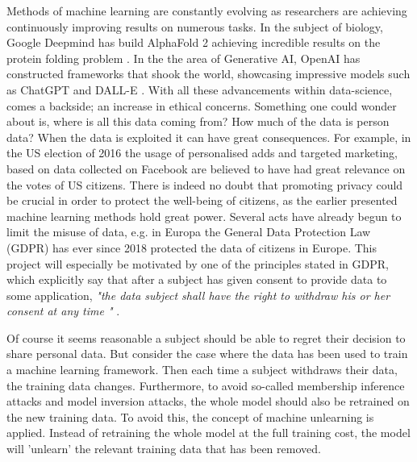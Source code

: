



Methods of machine learning are constantly evolving as researchers are achieving continuously improving results on numerous tasks. In the subject of biology, Google Deepmind has build AlphaFold 2 achieving incredible results on the protein folding problem \cite{jumper_highly_2021}. In the the area of Generative AI, OpenAI has constructed frameworks that shook the world, showcasing impressive models such as ChatGPT \cite{brown_language_2020} and DALL-E \cite{ramesh_zero-shot_2021}. With all these advancements within data-science, comes a backside; an increase in ethical concerns. Something one could wonder about is, where is all this data coming from? How much of the data is person data? When the data is exploited it can have great consequences. For example, in the US election of 2016 the usage of personalised adds and targeted marketing, based on data collected on Facebook are believed to have had great relevance on the votes of US citizens. There is indeed no doubt that promoting privacy could be crucial in order to protect the well-being of citizens, as the earlier presented machine learning methods hold great power.  Several acts have already begun to limit the misuse of data, e.g. in Europa the General Data Protection Law (GDPR) has ever since 2018 protected the data of citizens in Europe. This project will especially be motivated by one of the principles stated in GDPR, which explicitly say that after a subject has given consent to provide data to some application, \textit{"the data subject shall have the right to withdraw his or her consent at any time "}  \cite{noauthor_art_nodate}. 

\begin{comment}
\textit{The right to be forgotten} is something that has been introduced in 
\begin{itemize}
    \item European Union's General Data Protection Regulation (GDPR)
    \item The California Consumer Privacy Act (CCPA)
    \item The Act on the Protection of Personal Information (APPI)
    \item Canada's Consumer Privacy Protection Act (CPPA)
\end{itemize}
\end{comment}


Of course it seems reasonable a subject should be able to regret their decision to share personal data. But consider the case where the data has been used to train a machine learning framework. Then each time a subject withdraws their data, the training data changes. Furthermore, to avoid so-called membership inference attacks and model inversion attacks, the whole model should also be retrained on the new training data. To avoid this, the concept of machine unlearning is applied. Instead of retraining the whole model at the full training cost, the model will 'unlearn' the relevant training data that has been removed. 


